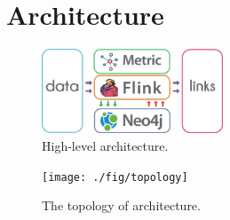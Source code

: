 \section{Architecture}
\label{sec:architecture}

\begin{figure}[!ht]
	\centering
	\includegraphics[width=0.48\textwidth]{fig/crimegraph-layered-architecture.eps}
	\caption{High-level architecture.}
	\label{fig:layered-architecture}
\end{figure}

\lipsum[1]

\begin{figure}
\centering
\texttt{[image: ./fig/topology]}
\caption{The topology of architecture.}
\label{fig:architecture}
\end{figure}

\lipsum[1]
